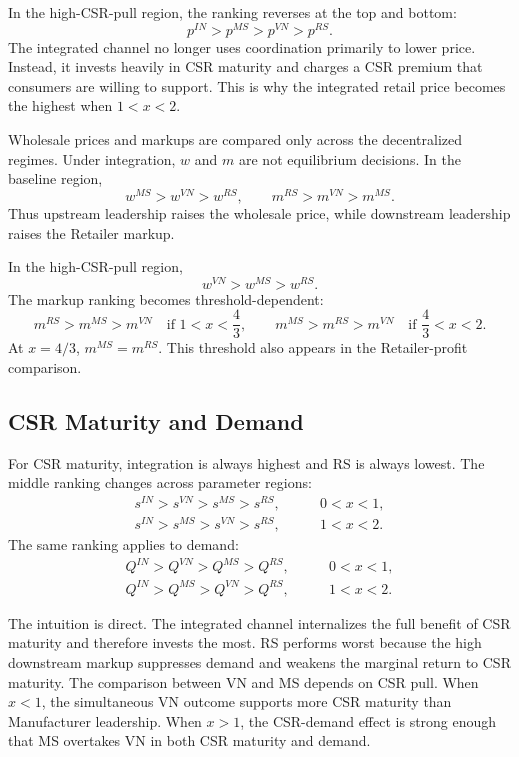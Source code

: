 In the high-CSR-pull region, the ranking reverses at the top and bottom:
\begin{equation*}
    p^{IN}>p^{MS}>p^{VN}>p^{RS}.
\end{equation*}
The integrated channel no longer uses coordination primarily to lower price. Instead, it invests heavily in CSR maturity and charges a CSR premium that consumers are willing to support. This is why the integrated retail price becomes the highest when $1<x<2$.

Wholesale prices and markups are compared only across the decentralized regimes. Under integration, $w$ and $m$ are not equilibrium decisions. In the baseline region,
\begin{equation*}
    w^{MS}>w^{VN}>w^{RS},
    \qquad
    m^{RS}>m^{VN}>m^{MS}.
\end{equation*}
Thus upstream leadership raises the wholesale price, while downstream leadership raises the Retailer markup.

In the high-CSR-pull region,
\begin{equation*}
    w^{VN}>w^{MS}>w^{RS}.
\end{equation*}
The markup ranking becomes threshold-dependent:
\begin{equation*}
    m^{RS}>m^{MS}>m^{VN}\quad \text{if }1<x<\frac43,
    \qquad
    m^{MS}>m^{RS}>m^{VN}\quad \text{if }\frac43<x<2.
\end{equation*}
At $x=4/3$, $m^{MS}=m^{RS}$. This threshold also appears in the Retailer-profit comparison.

\subsection{CSR Maturity and Demand}
\label{sec:sD-comparison}

For CSR maturity, integration is always highest and RS is always lowest. The middle ranking changes across parameter regions:
\begin{align*}
    s^{IN}>s^{VN}>s^{MS}>s^{RS}, \qquad &0<x<1,\\
    s^{IN}>s^{MS}>s^{VN}>s^{RS}, \qquad &1<x<2.
\end{align*}
The same ranking applies to demand:
\begin{align*}
    Q^{IN}>Q^{VN}>Q^{MS}>Q^{RS}, \qquad &0<x<1,\\
    Q^{IN}>Q^{MS}>Q^{VN}>Q^{RS}, \qquad &1<x<2.
\end{align*}

The intuition is direct. The integrated channel internalizes the full benefit of CSR maturity and therefore invests the most. RS performs worst because the high downstream markup suppresses demand and weakens the marginal return to CSR maturity. The comparison between VN and MS depends on CSR pull. When $x<1$, the simultaneous VN outcome supports more CSR maturity than Manufacturer leadership. When $x>1$, the CSR-demand effect is strong enough that MS overtakes VN in both CSR maturity and demand.

